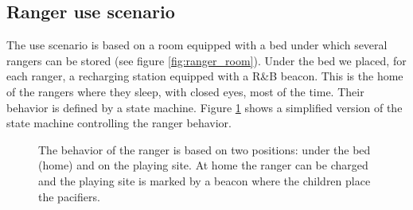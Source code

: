 \documentclass{sig-alternate}
\begin{document}
\subsection{Ranger use scenario}
\label{sec:rangeruse} 

The use scenario is based on a room equipped with a bed under which several
rangers can be stored (see figure \ref{fig:ranger_room}).  Under the bed we
placed, for each ranger, a recharging station equipped with a R\&B beacon.  This
is the home of the rangers where they sleep, with closed eyes, most of the time.
Their behavior is defined by a state machine.  Figure \ref{fig:ranger_behav}
shows a simplified version of the state machine controlling the ranger behavior. 

\begin{figure}[ht]
    \centering

  \caption{The behavior of the ranger is based on two positions: under the bed
  (home) and on the playing site. At home the ranger can be charged and the
  playing site is marked by a beacon where the children place the pacifiers.}
  \label{fig:ranger_behav} 
\end{figure}
\end{document}
